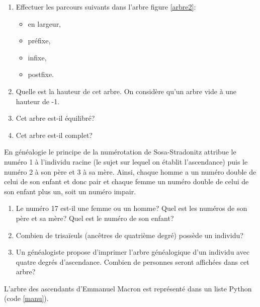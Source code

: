 \documentclass[a4paper,11pt]{article}
\begin{document}
\begin{Form}
\begin{exo}
\begin{center}
\label{arbre2}
\end{center}
\begin{enumerate}
\item Effectuer les parcours suivants dans l'arbre figure \ref{arbre2}:
\begin{itemize}
\item en largeur,
\item préfixe,
\item infixe,
\item postfixe.
\end{itemize}
\item Quelle est la hauteur de cet arbre. On considère qu'un arbre vide à une hauteur de -1.
\item Cet arbre est-il équilibré?
\item Cet arbre est-il complet?
\end{enumerate}
\end{exo}
\begin{exo}
En généalogie le principe de la numérotation de Sosa-Stradonitz attribue le numéro 1 à l’individu racine (le sujet sur lequel on établit l’ascendance) puis le numéro 2 à son père et 3 à sa mère. Ainsi, chaque homme a un numéro double de celui de son enfant et donc pair et chaque femme un numéro double de celui de son enfant plus un, soit un numéro impair.
\begin{enumerate}
\item Le numéro 17 est-il une femme ou un homme? Quel est les numéros de son père et sa mère? Quel est le numéro de son enfant?
\item Combien de trisaïeuls (ancêtres de quatrième degré) possède un individu?
\item Un généalogiste propose d'imprimer l'arbre généalogique d'un individu avec quatre degrés d'ascendance. Combien de personnes seront affichées dans cet arbre?
\end{enumerate}
L'arbre des ascendants d'Emmanuel Macron est représenté dans un liste Python (code \ref{manu}).
\begin{center}


\end{center}
\end{exo}
\end{Form}
\end{document}
